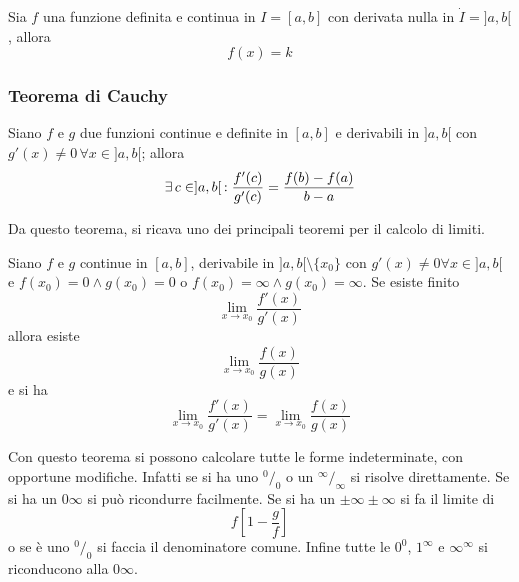 \begin{lagrangeLemma2}\hypertarget{teor:lagrange:2}{}
  Sia $f$ una funzione definita e continua in $I=[a,b]$ con derivata nulla in $\dot{I}=]a,b[$, 
  allora
  \begin{equation*}
    f(x) = k
  \end{equation*}
\end{lagrangeLemma2}

\subsubsection{Teorema di Cauchy}
\begin{cauchy}
  Siano $f$ e $g$ due funzioni continue e definite in $[a,b]$ e derivabili in $]a,b[$ con
  $g'(x)\neq0\,\forall x\in]a,b[$; allora
  \begin{equation*}
    \exists\,c\in]a,b[\,: \frac{f'(c)}{g'(c)}=\frac{f(b)-f(a)}{b-a}
  \end{equation*}
\end{cauchy}
Da questo teorema, si ricava uno dei principali teoremi per il calcolo di limiti.
\begin{hopital}
  Siano $f$ e $g$ continue in $[a,b]$, derivabile in $]a,b[\setminus\{x_0\}$ con 
  $g'(x)\neq0\forall x\in]a,b[$ e $f(x_0)=0 \land g(x_0)=0$ o $f(x_0)=\infty\land g(x_0)=\infty$.
  Se esiste finito
  \begin{equation*}
    \lim\limits_{x\to x_0} \frac{f'(x)}{g'(x)}
  \end{equation*}
  allora esiste
  \begin{equation*}
    \lim\limits_{x\to x_0} \frac{f(x)}{g(x)}
  \end{equation*}
  e si ha
  \begin{equation*}
    \lim\limits_{x\to x_0} \frac{f'(x)}{g'(x)} = \lim\limits_{x\to x_0} \frac{f(x)}{g(x)}
  \end{equation*}
\end{hopital}
Con questo teorema si possono calcolare tutte le forme indeterminate, con opportune modifiche. 
Infatti se si ha uno $^0\!/_0$ o un $^\infty\!/_\infty$ si risolve direttamente. Se si ha un
$0\infty$ si può ricondurre facilmente. Se si ha un $\pm\infty\pm\infty$
si fa il limite di
\begin{equation*}
  f \left[ 1-\frac{g}{f} \right]
\end{equation*}
o se è uno $^0\!/_0$ si faccia il denominatore comune. Infine tutte le $0^0$, $1^\infty$ e
$\infty^\infty$ si riconducono alla $0\infty$.

